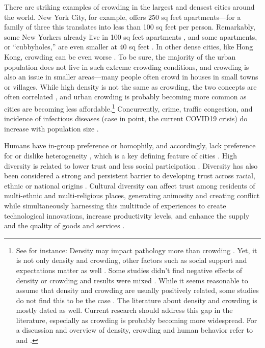 \documentclass[11pt, letterpaper]{article}
\begin{document}
\begin{spacing}{1.4}
There are striking examples of crowding in the largest and densest cities around the world. New York City, for example, offers 250 sq feet apartments---for a family of three this translates into less than 100 sq feet per person. Remarkably, some New Yorkers already live in 100 sq feet apartments \citep{abc,yoneda,dailynews}, and some apartments, or ``cubbyholes,'' are even smaller at 40 sq feet \citep{newyorktimes}. In other dense cities, like Hong Kong, crowding can be even worse \citep{newyorktimes2}. To
  be sure, the majority of the urban population does not live in such extreme crowding conditions, and crowding is also an issue in smaller areas---many people often crowd in houses in small towns or villages.
  While high density is not the same as crowding, the two concepts are often
  correlated \citep{meyer13}, and urban crowding is probably becoming more
  common  as cities are becoming less affordable.\footnote{See for instance: \citet{misraCL15oct6,floridaCL18apr11,weinbergCL16aug11,solariMISC19apr24,schuetzMISC19may7,kotkin_db_mar20_13}
%    
Density may impact pathology more than crowding \citep{levy1974effects}. Yet, it is not only density and crowding, other  factors such as social support and expectations matter as well \citep{cassel2017health,chan78}. Some
  studies didn't find negative effects of density or crowding and results were  mixed \citep{collette1976urban}. While it seems  reasonable to assume that density and crowding are usually positively related, some studies do not
  find  this to be the case \citep{webb1975meaning,rodgers1982density}. 
 The literature about density
  and crowding is mostly dated as well. Current research should address this gap in the literature, especially as crowding is probably becoming more widespread.
%
For a discussion and overview of density, crowding and human behavior refer to \citet{boots1979population,choldin1978urban} and \citet{ramsden09}.} 
% 
Concurrently,  crime, traffic congestion, and incidence of infectious diseases ({case in point, the current COVID19 crisis}) do increase with population size \citep{bettencourt10,bettencourt10b,bettencourt07}.

Humans have in-group preference or homophily, and
accordingly, lack preference for or dislike heterogeneity
\citep{smith14,mcpherson01,bleidorn16,putnam07}, which is a key defining feature
of cities \citep{wirth38,amin06,thrift05}. High diversity is related to lower trust and less social participation \citep{alesina99,alesina00,luttmer01,alesina02,rodriguez2019does}.  
Diversity has also been considered a strong and persistent barrier to developing trust across racial, ethnic or national origins \citep{glaeser00}. Cultural diversity can affect trust among residents of multi-ethnic and multi-religious places, generating animosity and creating conflict while simultaneously harnessing this multitude of experiences to create technological innovations, increase productivity levels, and enhance the supply and the quality of goods and services \citet{rodriguez2019does}. 


\end{spacing}
\end{document}

